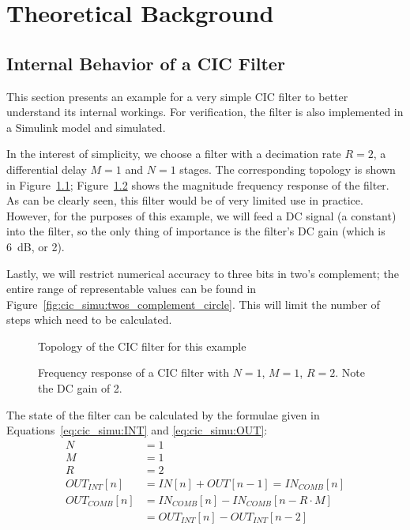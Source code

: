 \chapter{Theoretical Background}
\label{ch:app:theoretical_background}

\section{Internal Behavior of a CIC Filter}
\label{sec:app:cic_simu}

This  section presents  an example  for  a very  simple CIC  filter to  better
understand  its  internal  workings. For  verification,  the  filter  is  also
implemented in a Simulink model and simulated.

In the interest of simplicity, we choose  a filter with a decimation rate $R =
2$, a differential delay $M=1$ and $N=1$ stages. The corresponding topology is
shown in Figure~\ref{fig:cic_simu:topo}; Figure~\ref{fig:cic_simu:freqz} shows
the magnitude frequency  response of the filter. As can be  clearly seen, this
filter would be of very limited  use in practice. However, for the purposes of
this example, we  will feed a DC  signal (a constant) into the  filter, so the
only thing  of importance is  the filter's DC  gain (which is  \SI{6}{\dB}, or
\num{2}).

Lastly,  we  will   restrict  numerical  accuracy  to  three   bits  in  two's
complement;  the  entire  range  of  representable  values  can  be  found  in
Figure~\ref{fig:cic_simu:twos_complement_circle}. This  will limit  the number
of steps which need to be calculated.

\begin{figure}
    \centering
    
    \caption[Topology of Example Filter]{Topology of the CIC filter for this example}
    \label{fig:cic_simu:topo}
\end{figure}

\begin{figure}
    \centering
    
    \caption[Frequency Respose of Example CIC Filter]{%
        Frequency response of a CIC  filter with $N=1$, $M=1$, $R=2$. Note the
        DC gain of \num{2}.%
    }
    \label{fig:cic_simu:freqz}
\end{figure}

The  state  of  the  filter  can  be  calculated  by  the  formulae  given  in
Equations~\ref{eq:cic_simu:INT} and \ref{eq:cic_simu:OUT}:
\begin{align}
    N             & = 1 \nonumber\\     
    M             & = 1 \nonumber\\
    R             & = 2 \nonumber\\
    OUT_{INT}[n]  & = IN[n]        + OUT[n-1] = IN_{COMB}[n] 
    \label{eq:cic_simu:INT} \\
    OUT_{COMB}[n] & = IN_{COMB}[n] - IN_{COMB}[n-R\cdot M] 
    \nonumber\\
                  & = OUT_{INT}[n] - OUT_{INT}[n-2] 
    \label{eq:cic_simu:OUT}
\end{align}

